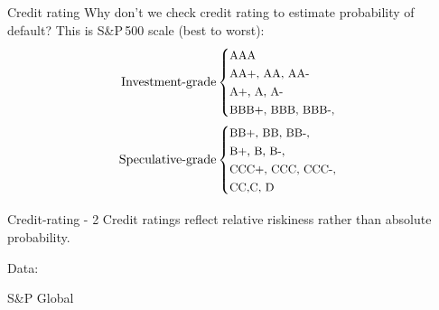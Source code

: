 \documentclass{beamer}
\newcommand{\en}[1]{\begin{otherlanguage}{english}#1\end{otherlanguage}}
\begin{document}
\begin{frame}{Credit rating}
\justify
Why don't we check credit rating to estimate probability of default? This is S\&P\,500 scale (best to worst):
\begin{align*}
\text{Investment-grade}
\small
&\begin{cases}
\small \text{AAA} \\
\small \text{AA+, AA, AA-} \\
\small \text{A+, A, A-} \\
\small \text{BBB+, BBB, BBB-,}
\end{cases} \\
\text{Speculative-grade}
&\begin{cases}
\small \text{BB+, BB, BB-,} \\
\small \text{B+, B, B-,} \\
\small \text{CCC+, CCC, CCC-,} \\
\small \text{CC,C, D}
\end{cases}
\end{align*}
\end{frame}



\newcommand{\addDefaultRatePlot}[3] {

	\addplot[
		color = #2,
		mark = #3,
		thick
	]
	table[
		x = year,
		y = #1,
		col sep = comma
	]
	{sp_2020_global_corporate_default_rates.csv};
}

\begin{frame}{Credit-rating - 2}
\justify
Credit ratings reflect relative riskiness rather than absolute probability.

\justify
\centering
{}

\centering
\small Data: \en{S\&P Global}
\end{frame}
\end{document}
